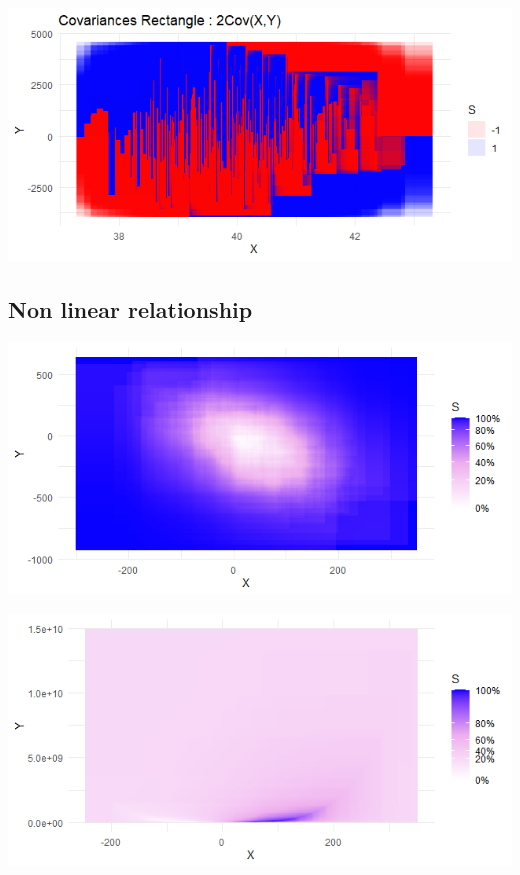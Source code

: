 \documentclass[
]{report}
\begin{document}
\begin{minipage}{0.45\textwidth}
    \includegraphics{graph_rect_heterosk.png}
\end{minipage}

\hypertarget{non-linear-relationship}{%
\subsection{Non linear relationship}\label{non-linear-relationship}}

\begin{minipage}{0.45\textwidth}
    \includegraphics{graph_plotnetrec_normal.png}
\end{minipage} 
\hspace{3ex}
\begin{minipage}{0.45\textwidth}
    \includegraphics{graph_plotnetrect_nolinear.png}
\end{minipage}
\end{document}
